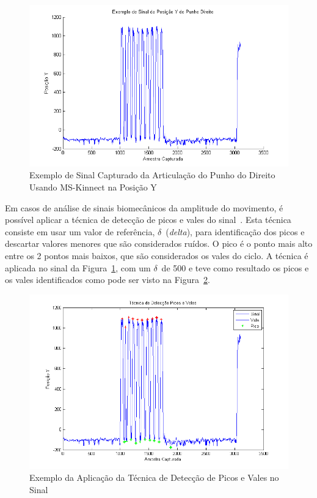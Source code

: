 \begin{figure}[!htb]
     \centering
     \includegraphics[width=1\textwidth]{./img/exsinalposicaoypunhodireito.png}
     \caption{Exemplo de Sinal Capturado da Articulação do Punho do Direito Usando MS-Kinnect na Posição Y}
     \label{img:exsinalposicaopunho}
\end{figure}

Em casos de análise de sinais biomecânicos da amplitude do movimento, é possível aplicar a técnica de detecção de picos e vales do sinal~\cite{peakdetect}. Esta técnica consiste em usar um valor de referência, $\delta$\ (\textit{delta}), para identificação dos picos e descartar valores menores que são considerados ruídos. O pico é o ponto mais alto entre os 2 pontos mais baixos, que são considerados os vales do ciclo. A técnica é aplicada no sinal da Figura~\ref{img:exsinalposicaopunho}, com um $\delta$\ de 500 e teve como resultado os picos e os vales identificados como pode ser visto na Figura~\ref{img:expicosvales}.

\begin{figure}[!htb]
     \centering
     \includegraphics[width=1\textwidth]{./img/deteccaopicosvales.png}
     \caption{Exemplo da Aplicação da Técnica de Detecção de Picos e Vales no Sinal}
     \label{img:expicosvales}
\end{figure}


